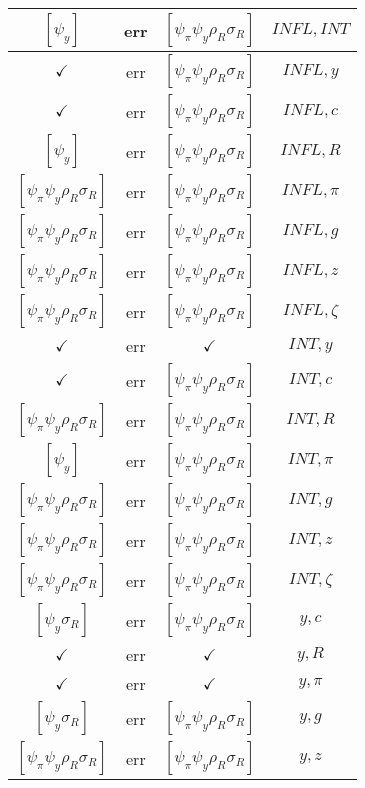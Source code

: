 \documentclass[a4paper,10pt]{article}
\begin{document}
\begin{longtable}{|c|c|c|c|}
\hline
$[\psi_y ]$ & err & $[\psi_\pi \psi_y \rho_R \sigma_R ]$ & ${INFL},{INT}$ \\
\hline
$\checkmark$ & err & $[\psi_\pi \psi_y \rho_R \sigma_R ]$ & ${INFL},{y}$ \\
\hline
$\checkmark$ & err & $[\psi_\pi \psi_y \rho_R \sigma_R ]$ & ${INFL},{c}$ \\
\hline
$[\psi_y ]$ & err & $[\psi_\pi \psi_y \rho_R \sigma_R ]$ & ${INFL},{R}$ \\
\hline
$[\psi_\pi \psi_y \rho_R \sigma_R ]$ & err & $[\psi_\pi \psi_y \rho_R \sigma_R ]$ & ${INFL},{\pi}$ \\
\hline
$[\psi_\pi \psi_y \rho_R \sigma_R ]$ & err & $[\psi_\pi \psi_y \rho_R \sigma_R ]$ & ${INFL},{g}$ \\
\hline
$[\psi_\pi \psi_y \rho_R \sigma_R ]$ & err & $[\psi_\pi \psi_y \rho_R \sigma_R ]$ & ${INFL},{z}$ \\
\hline
$[\psi_\pi \psi_y \rho_R \sigma_R ]$ & err & $[\psi_\pi \psi_y \rho_R \sigma_R ]$ & ${INFL},{\zeta}$ \\
\hline
$\checkmark$ & err & $\checkmark$ & ${INT},{y}$ \\
\hline
$\checkmark$ & err & $[\psi_\pi \psi_y \rho_R \sigma_R ]$ & ${INT},{c}$ \\
\hline
$[\psi_\pi \psi_y \rho_R \sigma_R ]$ & err & $[\psi_\pi \psi_y \rho_R \sigma_R ]$ & ${INT},{R}$ \\
\hline
$[\psi_y ]$ & err & $[\psi_\pi \psi_y \rho_R \sigma_R ]$ & ${INT},{\pi}$ \\
\hline
$[\psi_\pi \psi_y \rho_R \sigma_R ]$ & err & $[\psi_\pi \psi_y \rho_R \sigma_R ]$ & ${INT},{g}$ \\
\hline
$[\psi_\pi \psi_y \rho_R \sigma_R ]$ & err & $[\psi_\pi \psi_y \rho_R \sigma_R ]$ & ${INT},{z}$ \\
\hline
$[\psi_\pi \psi_y \rho_R \sigma_R ]$ & err & $[\psi_\pi \psi_y \rho_R \sigma_R ]$ & ${INT},{\zeta}$ \\
\hline
$[\psi_y \sigma_R ]$ & err & $[\psi_\pi \psi_y \rho_R \sigma_R ]$ & ${y},{c}$ \\
\hline
$\checkmark$ & err & $\checkmark$ & ${y},{R}$ \\
\hline
$\checkmark$ & err & $\checkmark$ & ${y},{\pi}$ \\
\hline
$[\psi_y \sigma_R ]$ & err & $[\psi_\pi \psi_y \rho_R \sigma_R ]$ & ${y},{g}$ \\
\hline
$[\psi_\pi \psi_y \rho_R \sigma_R ]$ & err & $[\psi_\pi \psi_y \rho_R \sigma_R ]$ & ${y},{z}$ \\

\end{longtable}
\end{document}
